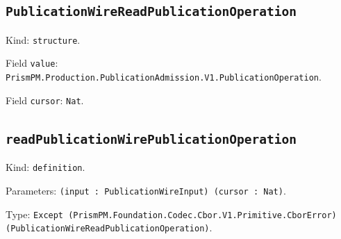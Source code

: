 \documentclass[11pt]{article}
\begin{document}
\subsection*{\texttt{PublicationWireReadPublicationOperation}}
\noindent Kind: \texttt{structure}.\par
\noindent Field \texttt{value}: \texttt{PrismPM.Production.PublicationAdmission.V1.PublicationOperation}.\par
\noindent Field \texttt{cursor}: \texttt{Nat}.\par
\subsection*{\texttt{readPublicationWirePublicationOperation}}
\noindent Kind: \texttt{definition}.\par
\noindent Parameters: \texttt{(input : PublicationWireInput) (cursor : Nat)}.\par
\noindent Type: \texttt{Except (PrismPM.Foundation.Codec.Cbor.V1.Primitive.CborError) (PublicationWireReadPublicationOperation)}.\par
\end{document}

